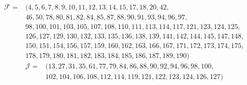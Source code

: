 \begin{align*}
\mathcal F={}&(4, 5, 6, 7, 8, 9, 10, 11, 12, 13, 14, 15, 17, 18, 20, 42, \\
 &46, 50, 78, 80, 81, 82, 84, 85, 87, 88, 90, 91, 93, 94, 96, 97, \\
 &98, 100, 101, 103, 105, 107, 108, 110, 111, 113, 114, 117, 121, 123, 124, 125, \\
 &126, 127, 129, 130, 132, 133, 135, 136, 138, 139, 141, 142, 144, 145, 147, 148, \\
 &150, 151, 154, 156, 157, 159, 160, 162, 163, 166, 167, 171, 172, 173, 174, 175, \\
 &178, 179, 180, 181, 182, 183, 184, 185, 186, 187, 189, 190)
\end{align*}
\begin{align*}
\mathcal J={}&(13, 27, 31, 35, 61, 77, 79, 84, 86, 88, 90, 92, 94, 96, 98, 100, \\
 &102, 104, 106, 108, 112, 114, 119, 121, 122, 123, 124, 126, 127)
\end{align*}
